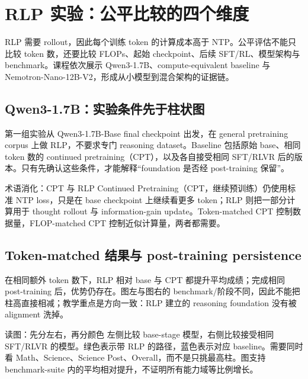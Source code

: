 \section{RLP 实验：公平比较的四个维度}

RLP 需要 rollout，因此每个训练 token 的计算成本高于 NTP。公平评估不能只比较 token 数，还要比较 FLOPs、起始 checkpoint、后续 SFT/RL、模型架构与 benchmark。课程依次展示 Qwen3-1.7B、compute-equivalent baseline 与 Nemotron-Nano-12B-V2，形成从小模型到混合架构的证据链。

\subsection{Qwen3-1.7B：实验条件先于柱状图}

第一组实验从 Qwen3-1.7B-Base final checkpoint 出发，在 general pretraining corpus 上做 RLP，不要求专门 reasoning dataset。Baseline 包括原始 base、相同 token 数的 continued pretraining（CPT），以及各自接受相同 SFT/RLVR 后的版本。只有先确认这些条件，才能解释“foundation 是否经 post-training 保留”。


\begin{knowledgebox}{术语消化：CPT 与 RLP}
Continued Pretraining（CPT，继续预训练）仍使用标准 NTP loss，只是在 base checkpoint 上继续看更多 token；RLP 则把一部分计算用于 thought rollout 与 information-gain update。Token-matched CPT 控制数据量，FLOP-matched CPT 控制近似计算量，两者都需要。
\end{knowledgebox}

\subsection{Token-matched 结果与 post-training persistence}

在相同额外 token 数下，RLP 相对 base 与 CPT 都提升平均成绩；完成相同 post-training 后，优势仍存在。图左与图右的 benchmark/阶段不同，因此不能把柱高直接相减；教学重点是方向一致：RLP 建立的 reasoning foundation 没有被 alignment 洗掉。


\begin{knowledgebox}{读图：先分左右，再分颜色}
左侧比较 base-stage 模型，右侧比较接受相同 SFT/RLVR 的模型。绿色表示带 RLP 的路径，蓝色表示对应 baseline。需要同时看 Math、Science、Science Post、Overall，而不是只挑最高柱。图支持 benchmark-suite 内的平均相对提升，不证明所有能力域等比例增长。
\end{knowledgebox}

